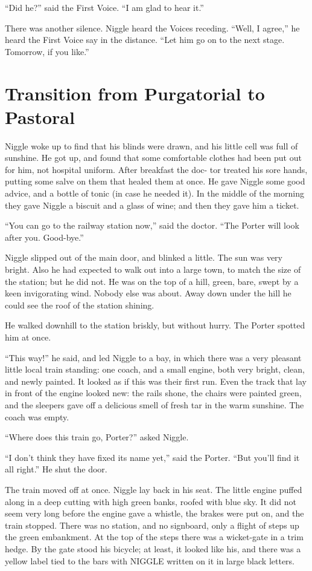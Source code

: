 \documentclass[english]{scrartcl}
\begin{document}
“Did he?” said the First Voice. “I am glad to hear it.”

There was another silence. Niggle heard the Voices receding. “Well, I agree,” he heard the First Voice say in the distance. “Let him go on to the next stage. Tomorrow, if you like.”

\section*{Transition from Purgatorial to Pastoral}

Niggle woke up to find that his blinds were drawn, and his little cell was full of sunshine. He got up, and found that some comfortable clothes had been put out for him, not hospital uniform. After breakfast the doc- tor treated his sore hands, putting some salve on them that healed them at once. He gave Niggle some good advice, and a bottle of tonic (in case he needed it). In the middle of the morning they gave Niggle a biscuit and a glass of wine; and then they gave him a ticket.

“You can go to the railway station now,” said the doctor. “The Porter will look after you. Good-bye.”

Niggle slipped out of the main door, and blinked a little. The sun was very bright. Also he had expected to walk out into a large town, to match the size of the station; but he did not. He was on the top of a hill, green, bare, swept by a keen invigorating wind. Nobody else was about. Away down under the hill he could see the roof of the station shining.

He walked downhill to the station briskly, but without hurry. The Porter spotted him at once.

“This way!” he said, and led Niggle to a bay, in which there was a very pleasant little local train standing: one coach, and a small engine, both very bright, clean, and newly painted. It looked as if this was their first run. Even the track that lay in front of the engine looked new: the rails shone, the chairs were painted green, and the sleepers gave off a delicious smell of fresh tar in the warm sunshine. The coach was empty.

“Where does this train go, Porter?” asked Niggle.

“I don’t think they have fixed its name yet,” said the Porter. “But you’ll find it all right.” He shut the door.

The train moved off at once. Niggle lay back in his seat. The little engine puffed along in a deep cutting with high green banks, roofed with blue sky. It did not seem very long before the engine gave a whistle, the brakes were put on, and the train stopped. There was no station, and no signboard, only a flight of steps up the green embankment. At the top of the steps there was a wicket-gate in a trim hedge. By the gate stood his bicycle; at least, it looked like his, and there was a yellow label tied to the bars with NIGGLE written on it in large black letters.
\end{document}
